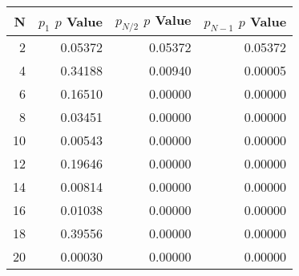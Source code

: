 \begin{tabular}{rrrr}
\toprule
  N &  $p_1$ $p$ Value &  $p_{N / 2}$ $p$ Value &  $p_{N - 1}$ $p$ Value \\
\midrule
  2 &          0.05372 &                0.05372 &                0.05372 \\
  4 &          0.34188 &                0.00940 &                0.00005 \\
  6 &          0.16510 &                0.00000 &                0.00000 \\
  8 &          0.03451 &                0.00000 &                0.00000 \\
 10 &          0.00543 &                0.00000 &                0.00000 \\
 12 &          0.19646 &                0.00000 &                0.00000 \\
 14 &          0.00814 &                0.00000 &                0.00000 \\
 16 &          0.01038 &                0.00000 &                0.00000 \\
 18 &          0.39556 &                0.00000 &                0.00000 \\
 20 &          0.00030 &                0.00000 &                0.00000 \\
\bottomrule
\end{tabular}
